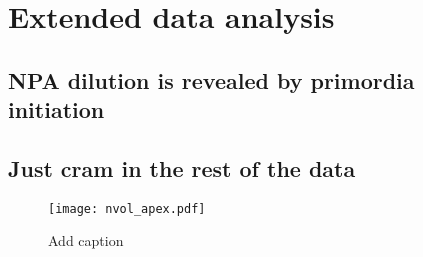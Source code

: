 
\ifpdf
\graphicspath{{Appendix2/Figs/Raster/}{Appendix2/Figs/PDF/}{Appendix2/Figs/}}
\else
\graphicspath{{Appendix2/Figs/Vector/}{Appendix2/Figs/}}
\fi
\chapter{Extended data analysis}
\section{NPA dilution is revealed by primordia initiation} %

\section{Just cram in the rest of the data} 

\begin{figure}[H]
  \centering
  \texttt{[image: nvol\_apex.pdf]}
  \caption{Add caption}
  \label{fig:nvol_apex}
\end{figure}



